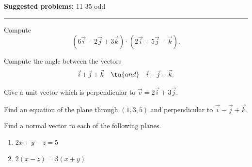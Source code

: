 \documentclass[12pt,reqno]{amsart}
\begin{document}
\textbf{Suggested problems:} 11-35 odd

\bigskip
\hrule

\bigskip

\prob Compute
	\[(6\vec{i} -2\vec{j} + 3\vec{k}) \cdot (2\vec{i}+5\vec{j}-\vec{k}).
	\]
	
\vfill
\prob Compute the angle between the vectors
	\[\vec{i} + \vec{j} + \vec{k} \quad \tn{and} \quad \vec{i} -\vec{j} - \vec{k}.
	\]

\vfill
\prob Give a unit vector which is perpendicular to $\vec{v} = 2\vec{i} +3\vec{j}$.

\vfill
\newpage
\prob Find an equation of the plane through $(1,3,5)$ and perpendicular to $\vec{i} - \vec{j} + \vec{k}$.

\vfill
\prob Find a normal vector to each of the following planes.

\medskip
\begin{enumerate}
\item $2x+y-z=5$\vfill
\item $2(x-z) = 3(x+y)$\vfill
\end{enumerate}
\end{document}
